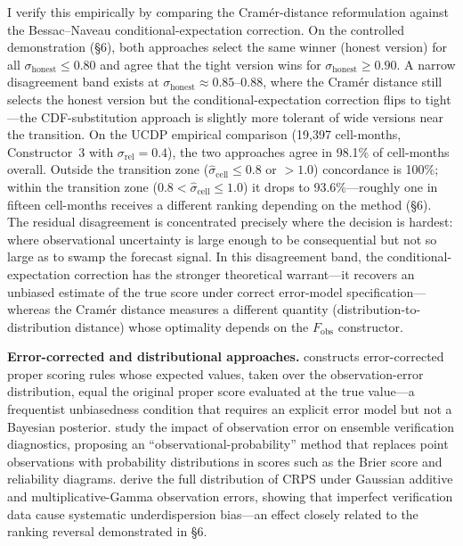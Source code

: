 I verify this empirically by comparing the Cram\'er-distance reformulation against the Bessac--Naveau conditional-expectation correction. On the controlled demonstration (\S6), both approaches select the same winner (honest version) for all $\sigma_\text{honest} \leq 0.80$ and agree that the tight version wins for $\sigma_\text{honest} \geq 0.90$. A narrow disagreement band exists at $\sigma_\text{honest} \approx 0.85$--$0.88$, where the Cram\'er distance still selects the honest version but the conditional-expectation correction flips to tight---the CDF-substitution approach is slightly more tolerant of wide versions near the transition. On the UCDP empirical comparison (19{,}397 cell-months, Constructor~3 with $\sigma_\text{rel} = 0.4$), the two approaches agree in 98.1\% of cell-months overall. Outside the transition zone ($\hat{\sigma}_\text{cell} \leq 0.8$ or $> 1.0$) concordance is 100\%; within the transition zone ($0.8 < \hat{\sigma}_\text{cell} \leq 1.0$) it drops to 93.6\%---roughly one in fifteen cell-months receives a different ranking depending on the method (\S6). The residual disagreement is concentrated precisely where the decision is hardest: where observational uncertainty is large enough to be consequential but not so large as to swamp the forecast signal. In this disagreement band, the conditional-expectation correction has the stronger theoretical warrant---it recovers an unbiased estimate of the true score under correct error-model specification---whereas the Cram\'er distance measures a different quantity (distribution-to-distribution distance) whose optimality depends on the $F_\text{obs}$ constructor.

\textbf{Error-corrected and distributional approaches.} \citet{ferro2017observation} constructs error-corrected proper scoring rules whose expected values, taken over the observation-error distribution, equal the original proper score evaluated at the true value---a frequentist unbiasedness condition that requires an explicit error model but not a Bayesian posterior. \citet{candille2008impact} study the impact of observation error on ensemble verification diagnostics, proposing an ``observational-probability'' method that replaces point observations with probability distributions in scores such as the Brier score and reliability diagrams. \citet{bessac2021forecast} derive the full distribution of CRPS under Gaussian additive and multiplicative-Gamma observation errors, showing that imperfect verification data cause systematic underdispersion bias---an effect closely related to the ranking reversal demonstrated in \S6.

